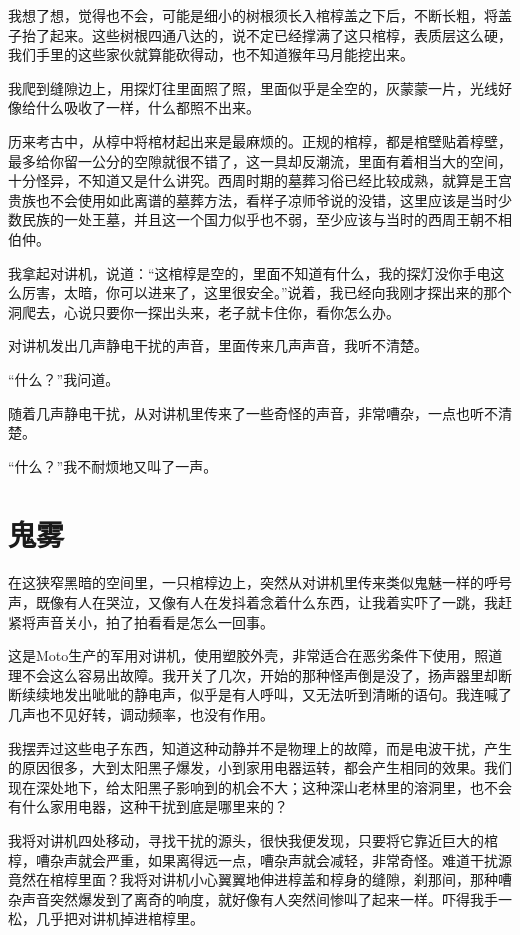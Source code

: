 我想了想，觉得也不会，可能是细小的树根须长入棺椁盖之下后，不断长粗，将盖子抬了起来。这些树根四通八达的，说不定已经撑满了这只棺椁，表质层这么硬，我们手里的这些家伙就算能砍得动，也不知道猴年马月能挖出来。

我爬到缝隙边上，用探灯往里面照了照，里面似乎是全空的，灰蒙蒙一片，光线好像给什么吸收了一样，什么都照不出来。

历来考古中，从椁中将棺材起出来是最麻烦的。正规的棺椁，都是棺壁贴着椁壁，最多给你留一公分的空隙就很不错了，这一具却反潮流，里面有着相当大的空间，十分怪异，不知道又是什么讲究。西周时期的墓葬习俗已经比较成熟，就算是王宫贵族也不会使用如此离谱的墓葬方法，看样子凉师爷说的没错，这里应该是当时少数民族的一处王墓，并且这一个国力似乎也不弱，至少应该与当时的西周王朝不相伯仲。

我拿起对讲机，说道：“这棺椁是空的，里面不知道有什么，我的探灯没你手电这么厉害，太暗，你可以进来了，这里很安全。”说着，我已经向我刚才探出来的那个洞爬去，心说只要你一探出头来，老子就卡住你，看你怎么办。

对讲机发出几声静电干扰的声音，里面传来几声声音，我听不清楚。

“什么？”我问道。

随着几声静电干扰，从对讲机里传来了一些奇怪的声音，非常嘈杂，一点也听不清楚。

“什么？”我不耐烦地又叫了一声。

\chapter{鬼雾}

在这狭窄黑暗的空间里，一只棺椁边上，突然从对讲机里传来类似鬼魅一样的呼号声，既像有人在哭泣，又像有人在发抖着念着什么东西，让我着实吓了一跳，我赶紧将声音关小，拍了拍看看是怎么一回事。

这是Moto生产的军用对讲机，使用塑胶外壳，非常适合在恶劣条件下使用，照道理不会这么容易出故障。我开关了几次，开始的那种怪声倒是没了，扬声器里却断断续续地发出呲呲的静电声，似乎是有人呼叫，又无法听到清晰的语句。我连喊了几声也不见好转，调动频率，也没有作用。

我摆弄过这些电子东西，知道这种动静并不是物理上的故障，而是电波干扰，产生的原因很多，大到太阳黑子爆发，小到家用电器运转，都会产生相同的效果。我们现在深处地下，给太阳黑子影响到的机会不大；这种深山老林里的溶洞里，也不会有什么家用电器，这种干扰到底是哪里来的？

我将对讲机四处移动，寻找干扰的源头，很快我便发现，只要将它靠近巨大的棺椁，嘈杂声就会严重，如果离得远一点，嘈杂声就会减轻，非常奇怪。难道干扰源竟然在棺椁里面？我将对讲机小心翼翼地伸进椁盖和椁身的缝隙，刹那间，那种嘈杂声音突然爆发到了离奇的响度，就好像有人突然间惨叫了起来一样。吓得我手一松，几乎把对讲机掉进棺椁里。

